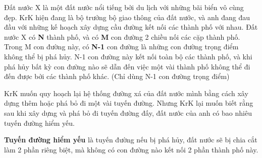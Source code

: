 Đất nước X là một đất nước nổi tiếng bởi du lịch với những bãi biển vô cùng đẹp. KrK hiện đang là bộ trưởng bộ giao thông của đất nước, và anh đang đau đầu với những kế hoạch xây dựng cầu đường kết nối các thành phố với nhau. Đất nước X có   \textbf{    N   }   thành phố, và có   \textbf{    M   }   con đường 2 chiều nối các cặp thành phố. Trong M con đường này, có   \textbf{    N-1   }   con đường là những con đường trọng điểm không thể bị phá hủy. N-1 con đường này kết nối toàn bộ các thành phố, và khi phá hủy bất kỳ con đường nào sẽ dẫn đến việc một vài thành phố không thể đi đến được bởi các thành phố khác. (Chỉ dùng N-1 con đường trọng điểm)  

   KrK muốn quy hoạch lại hệ thống đường xá của đất nước mình bằng cách xây dựng thêm hoặc phá bỏ đi một vài tuyến đường. Nhưng KrK lại muốn biết rằng sau khi xây dựng và phá bỏ đi tuyến đường đấy, đất nước của anh có bao nhiêu tuyến đường hiểm yếu.  

\textbf{    Tuyến đường hiểm yếu   }   là tuyến đường nếu bị phá hủy, đất nước sẽ bị chia cắt làm 2 phần riêng biệt, mà không có con đường nào kết nối 2 phần thành phố này.